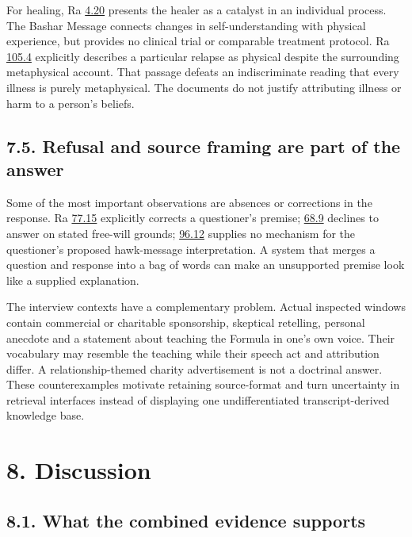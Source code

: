 \documentclass[
  11pt,
]{article}
\begin{document}
For healing, Ra \href{https://www.lawofone.info/s/4\#4.20}{4.20}
presents the healer as a catalyst in an individual process. The Bashar
Message connects changes in self-understanding with physical experience,
but provides no clinical trial or comparable treatment protocol. Ra
\href{https://www.lawofone.info/s/105\#105.4}{105.4} explicitly
describes a particular relapse as physical despite the surrounding
metaphysical account. That passage defeats an indiscriminate reading
that every illness is purely metaphysical. The documents do not justify
attributing illness or harm to a person's beliefs.

\FloatBarrier

\subsection{7.5. Refusal and source framing are part of the
answer}\label{refusal-and-source-framing-are-part-of-the-answer}

Some of the most important observations are absences or corrections in
the response. Ra \href{https://www.lawofone.info/s/77\#77.15}{77.15}
explicitly corrects a questioner's premise;
\href{https://www.lawofone.info/s/68\#68.9}{68.9} declines to answer on
stated free-will grounds;
\href{https://www.lawofone.info/s/96\#96.12}{96.12} supplies no
mechanism for the questioner's proposed hawk-message interpretation. A
system that merges a question and response into a bag of words can make
an unsupported premise look like a supplied explanation.

The interview contexts have a complementary problem. Actual inspected
windows contain commercial or charitable sponsorship, skeptical
retelling, personal anecdote and a statement about teaching the Formula
in one's own voice. Their vocabulary may resemble the teaching while
their speech act and attribution differ. A relationship-themed charity
advertisement is not a doctrinal answer. These counterexamples motivate
retaining source-format and turn uncertainty in retrieval interfaces
instead of displaying one undifferentiated transcript-derived knowledge
base.

\FloatBarrier

\section{8. Discussion}\label{discussion}

\FloatBarrier

\subsection{8.1. What the combined evidence
supports}\label{what-the-combined-evidence-supports}
\end{document}

